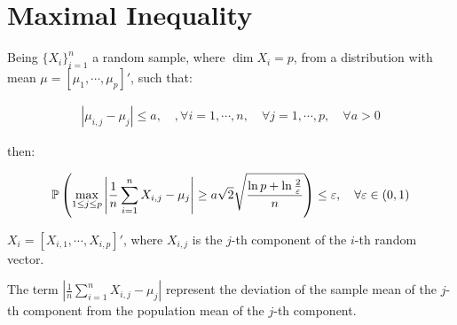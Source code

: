 \section{Maximal Inequality}

Being $\{X_i\}_{i=1}^n$ a random sample, where $\dim{X_i} = p$, from a distribution with mean $\mu = [\mu_1, \cdots, \mu_p]'$, such that:

\begin{align*}
|\mu_{i,j} - \mu_{j}| \leq a, \quad, \forall i = 1, \cdots, n, \quad \forall j = 1, \cdots, p, \quad \forall a > 0
\end{align*}

then: 

\begin{align*}
\mathbb{P}\left(
    \max_{1 \leq j \leq p}{
        \left|
            \frac{1}{n} \sum_{i=1}^{n} X_{i,j} - \mu_{j}
        \right|
    }
    \geq
    a \sqrt{2} \sqrt{
        \dfrac{\ln p + \ln \frac{2}{\varepsilon}}{n}
    }
\right) \leq \varepsilon, \quad \forall \varepsilon \in (0, 1)
\end{align*}

$X_i = [X_{i,1}, \cdots, X_{i,p}]'$, where $X_{i,j}$ is the $j$-th component of the $i$-th random vector.

The term 
$
\left|
        \frac{1}{n} \sum_{i=1}^{n} X_{i,j} - \mu_{j}
\right|
$
represent the deviation of the sample mean of the $j$-th component from the population mean of the $j$-th component.
